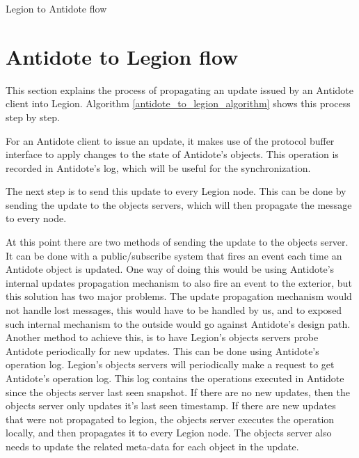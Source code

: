 \begin{algorithm}
\caption{Legion to Antidote flow}
\label{legion_to_antidote_algorithm}
\begin{algorithmic}[1]
    \EndIf
  \EndIf
\End
\end{algorithmic}
\end{algorithm}

\section{Antidote to Legion flow}
\label{sec:antidote_to_legion_flow}
This section explains the process of propagating an update issued by an Antidote client into Legion. Algorithm \ref{antidote_to_legion_algorithm} shows this process step by step.\par
	For an Antidote client to issue an update, it makes use of the protocol buffer interface to apply changes to the state of Antidote's objects. This operation is recorded in Antidote's log, which will be useful for the synchronization.\par	
	The next step is to send this update to every Legion node. This can be done by sending the update to the objects servers, which will then propagate the message to every node.\par
	At this point there are two methods of sending the update to the objects server. It can be done with a public/subscribe system that fires an event each time an Antidote object is updated. One way of doing this would be using Antidote's internal updates propagation mechanism to also fire an event to the exterior, but this solution has two major problems. The update propagation mechanism would not handle lost messages, this would have to be handled by us, and to exposed such internal mechanism to the outside would go against Antidote's design path.
	Another method to achieve this, is to have Legion's objects servers probe Antidote periodically for new updates. This can be done using Antidote's operation log. Legion's objects servers will periodically make a request to get Antidote's operation log. This log contains the operations executed in Antidote since the objects server last seen snapshot. If there are no new updates, then the objects server only updates it's last seen timestamp. If there are new updates that were not propagated to legion, the objects server executes the operation locally, and then propagates it to every Legion node. The objects server also needs to update the related meta-data for each object in the update.
	
